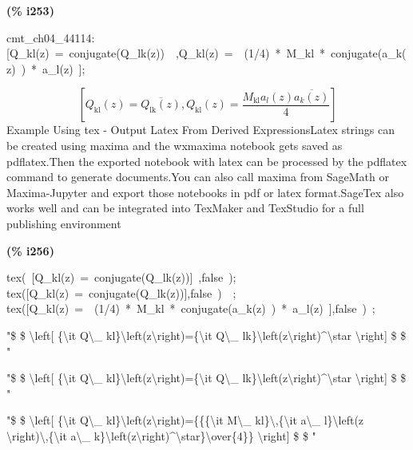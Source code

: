 \documentclass[fleqn]{article}
\begin{document}
\noindent
\begin{minipage}[t]{4.000000em}\color{red}\bfseries
(\% i253)	
\end{minipage}
\begin{minipage}[t]{\textwidth}\color{blue}
cmt\_ch04\_44114:[Q\_kl(z)\ =\ conjugate(Q\_lk(z))\ \ ,Q\_kl(z)\ =\ \ (1/4)\ *\ M\_kl\ *\ conjugate(a\_k(z)\ )\ *\ a\_l(z)\ ];
\end{minipage}
\[\displaystyle \tag{\% o253} 
\left[ {Q_{\ensuremath{\mathrm{kl}}}}(z)=\overline{{Q_{\ensuremath{\mathrm{lk}}}}(z)}\operatorname{,}{Q_{\ensuremath{\mathrm{kl}}}}(z)=\frac{{M_{\ensuremath{\mathrm{kl}}}} {a_l}(z) \overline{{a_k}(z)}}{4}\right] \mbox{}
\]
Example Using tex - Output Latex From Derived ExpressionsLatex strings can be created using maxima and the wxmaxima notebook gets saved as pdflatex.Then the exported notebook with latex  can be processed by the pdflatex command to generate documents.You can also call maxima from SageMath or  Maxima-Jupyter and export those notebooks in pdf or latex format.SageTex also works well and can be integrated into TexMaker and TexStudio for a full publishing environment


\noindent
\begin{minipage}[t]{4.000000em}\color{red}\bfseries
(\% i256)	
\end{minipage}
\begin{minipage}[t]{\textwidth}\color{blue}
tex(\ [Q\_kl(z)\ =\ conjugate(Q\_lk(z))]\ ,false\ );\\
tex([Q\_kl(z)\ =\ conjugate(Q\_lk(z))],false\ )\ \ ;\\
tex([Q\_kl(z)\ =\ \ (1/4)\ *\ M\_kl\ *\ conjugate(a\_k(z)\ )\ *\ a\_l(z)\ ],false\ )\ ;
\end{minipage}
\[\displaystyle \tag{\% o254} 
\mbox{}
\]"\$ \$ \backslash left[ \{\backslash it Q\backslash \_ kl\}\backslash left(z\backslash right)=\{\backslash it Q\backslash \_ lk\}\backslash left(z\backslash right)\textasciicircum\backslash star
  \backslash right] \$ \$ 
"


\[\tag{\% o255} 
\mbox{}
\]"\$ \$ \backslash left[ \{\backslash it Q\backslash \_ kl\}\backslash left(z\backslash right)=\{\backslash it Q\backslash \_ lk\}\backslash left(z\backslash right)\textasciicircum\backslash star
  \backslash right] \$ \$ 
"


\[\tag{\% o256} 
\mbox{}
\]"\$ \$ \backslash left[ \{\backslash it Q\backslash \_ kl\}\backslash left(z\backslash right)=\{\{\{\backslash it M\backslash \_ kl\}\backslash ,\{\backslash it a\backslash \_ l\}\backslash left(z
 \backslash right)\backslash ,\{\backslash it a\backslash \_ k\}\backslash left(z\backslash right)\textasciicircum\backslash star\}\backslash over\{4\}\} \backslash right] \$ \$ 
"
\end{document}
